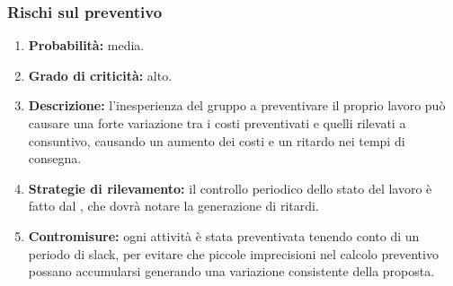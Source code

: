 \subsubsection{Rischi sul preventivo}
\begin{enumerate}
	\item \textbf{Probabilità:} media.
	\item \textbf{Grado di criticità:} alto.
	\item \textbf{Descrizione:} l'inesperienza del gruppo a preventivare il proprio lavoro può causare una forte variazione tra i costi preventivati e quelli rilevati a consuntivo, causando un aumento dei costi e un ritardo nei tempi di consegna.
	\item \textbf{Strategie di rilevamento:} il controllo periodico dello stato del lavoro è fatto dal \Responsabile{}, che dovrà notare la generazione di ritardi.
	\item \textbf{Contromisure:} ogni attività è stata preventivata tenendo conto di un periodo di slack, per evitare che piccole imprecisioni nel calcolo preventivo possano accumularsi generando una variazione consistente della proposta.
\end{enumerate}


